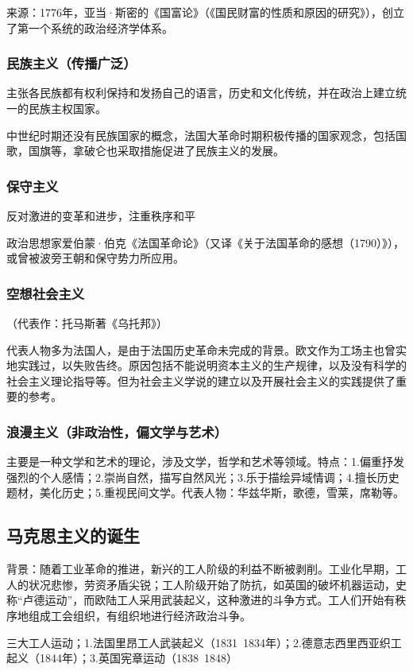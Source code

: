 来源：1776年，亚当·斯密的《国富论》（《国民财富的性质和原因的研究》），创立了第一个系统的政治经济学体系。

\subsubsection{民族主义（传播广泛）}
主张各民族都有权利保持和发扬自己的语言，历史和文化传统，并在政治上建立统一的民族主权国家。

中世纪时期还没有民族国家的概念，法国大革命时期积极传播的国家观念，包括国歌，国旗等，拿破仑也采取措施促进了民族主义的发展。

\subsubsection{保守主义}
反对激进的变革和进步，注重秩序和平

政治思想家爱伯蒙·伯克《法国革命论》（又译《关于法国革命的感想（1790）》），或曾被波旁王朝和保守势力所应用。

\subsubsection{空想社会主义}
（代表作：托马斯著《乌托邦》）

代表人物多为法国人，是由于法国历史革命未完成的背景。欧文作为工场主也曾实地实践过，以失败告终。原因包括不能说明资本主义的生产规律，以及没有科学的社会主义理论指导等。但为社会主义学说的建立以及开展社会主义的实践提供了重要的参考。

\subsubsection{浪漫主义（非政治性，偏文学与艺术）}

主要是一种文学和艺术的理论，涉及文学，哲学和艺术等领域。特点：1.偏重抒发强烈的个人感情；2.崇尚自然，描写自然风光；3.乐于描绘异域情调；4.擅长历史题材，美化历史；5.重视民间文学。代表人物：华兹华斯，歌德，雪莱，席勒等。

\subsection{马克思主义的诞生}
背景：随着工业革命的推进，新兴的工人阶级的利益不断被剥削。工业化早期，工人的状况悲惨，劳资矛盾尖锐；工人阶级开始了防抗，如英国的破坏机器运动，史称“卢德运动”，而欧陆工人采用武装起义，这种激进的斗争方式。工人们开始有秩序地组成工会组织，有组织地进行经济政治斗争。

三大工人运动；1.法国里昂工人武装起义（1831~1834年）；2.德意志西里西亚织工起义（1844年）；3.英国宪章运动（1838~1848）

